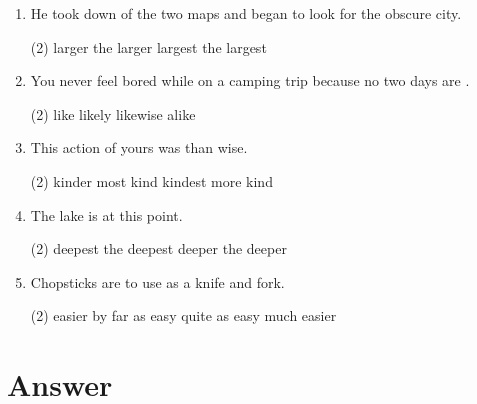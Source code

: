 \begin{enumerate}
\item He took down \ttu of the two maps and began to look for the obscure city.
  \begin{tasks}(2)
    \task larger
    \task the larger
    \task largest
    \task the largest
  \end{tasks}

\item You never feel bored while on a camping trip because no two days are \ttu.
  \begin{tasks}(2)
    \task like
    \task likely
    \task likewise
    \task alike
  \end{tasks}

\item This action of yours was \ttu than wise.
  \begin{tasks}(2)
    \task kinder
    \task most kind
    \task kindest
    \task more kind
  \end{tasks}

\item The lake is \ttu at this point.
  \begin{tasks}(2)
    \task deepest
    \task the deepest
    \task deeper
    \task the deeper
  \end{tasks}

\item Chopsticks are \ttu to use as a knife and fork.
  \begin{tasks}(2)
    \task easier
    \task by far as easy
    \task quite as easy
    \task much easier
  \end{tasks}

\end{enumerate}

\section{Answer}

